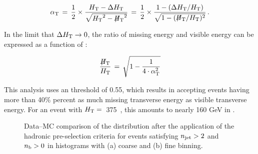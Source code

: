 \begin{equation}
  \label{eq:alphat2}
  \alpha_{\text{T}}\, = \,\frac{1}{2} \times \frac{\mbox{$H_\text{T}$} -
    \Delta\mbox{$H_\text{T}$}}{\sqrt{\mbox{$H_\text{T}$}^2 - \mbox{$\not\!\!H_\text{T}$}^2}} \, = \,\frac{1}{2} \times 
  \frac{1 - (\Delta\mbox{$H_\text{T}$}/\mbox{$H_\text{T}$})}{\sqrt{1 - (\mbox{$\not\!\!H_\text{T}$}/\mbox{$H_\text{T}$})^2}} \, . 
\end{equation}

In the limit that  $\Delta\mbox{$H_\text{T}$} \rightarrow 0$, the ratio of missing energy and
visible energy can be expressed as a function of \alphat:

\begin{equation}
  \label{eq:alphat3}
  \frac{\mbox{$\not\!\!H_\text{T}$}}{\mbox{$H_\text{T}$}} \, = \, \sqrt{ 1 - \frac{1}{4 \cdot \alpha_{\text{T}}^2} }
\end{equation}

This analysis uses an \alphat threshold of 0.55, which results in accepting
events having more than 40\% percent as much missing transverse energy as visible transverse
energy. For an event with $\mbox{$H_\text{T}$}=$~375~\gev, this amounts to nearly 160 GeV in \mht.  
%
\begin{figure}[!h]
  \centering
  \caption{Data--MC comparison of the \alphat distribution after 
           the application of the hadronic pre-selection 
           criteria for events satisfying $n_{\text{jet}} > 2$ and $n_{\text{b}} > 0$ 
           in histograms with (a) coarse and (b) fine binning.}
  \label{fig:figures_AlphaT_all}
\end{figure}

\FloatBarrier
